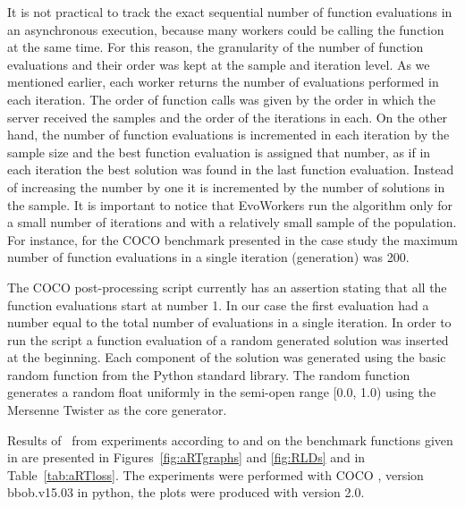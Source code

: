\documentclass[sigconf]{acmart}
\begin{document}
It is not practical to track the exact sequential 
number of function evaluations in an asynchronous 
execution, because many workers could be calling 
the function at the same time. For this reason, the 
granularity of the number of function evaluations and 
their order was kept at the sample and iteration level. 
As we mentioned earlier, each worker returns the number 
of evaluations performed in each iteration. The order 
of function calls was given by the order in which the 
server received the samples and the order of the 
iterations in each. On the other hand, the number of 
function evaluations is incremented in each iteration 
by the sample size and the best function evaluation is 
assigned that number,  as if in each iteration the best 
solution was found in the last function evaluation. Instead 
of increasing the number by one it is incremented by the 
number of solutions in the sample. 
It is important to notice that EvoWorkers run the algorithm 
only for a small number of iterations and with 
a relatively small sample of the population. For instance,
for the COCO benchmark presented in the case study the maximum number of 
function evaluations in a single iteration (generation) was 200.

The COCO post-processing script currently has an assertion stating
that all the function evaluations start at number 1. In our
case the first evaluation had a number equal to the total number
of evaluations in a single iteration. In order to run the script 
a function evaluation of a random generated solution was 
inserted at the beginning. Each component of the solution was generated
using the basic random function from the Python standard library. The
random function generates a random float uniformly in the semi-open 
range [0.0, 1.0) using the Mersenne Twister as the core generator.


Results of \algname\ from experiments according to \cite{hansen2016exp} 
and \cite{hansen2016perfass} on the benchmark
functions given in \cite{wp200901_2010,hansen2012fun} are presented in
Figures~\ref{fig:aRTgraphs} and \ref{fig:RLDs} and in Table~\ref{tab:aRTloss}. The experiments were performed with COCO \cite{hansen2016cocoplat}, version bbob.v15.03 in
python, the plots were produced with version 2.0.



\end{document}
